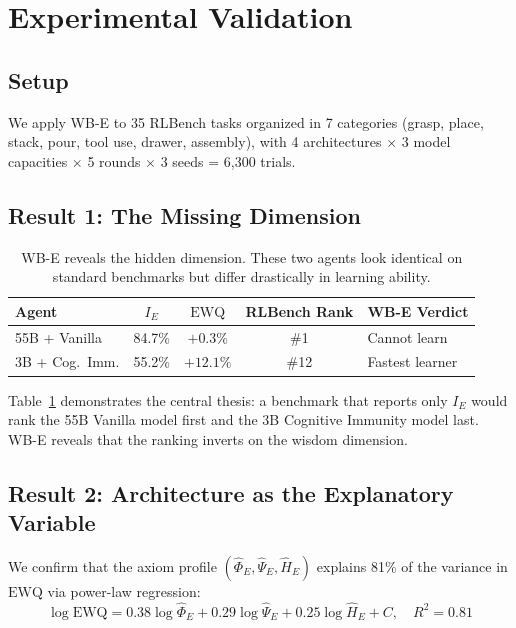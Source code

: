 \documentclass{article}
\newcommand{\EWQ}{\mathrm{EWQ}}
\begin{document}
\section{Experimental Validation}
\label{sec:experiments}

\subsection{Setup}

We apply WB-E to 35 RLBench tasks organized in 7 categories (grasp, place, stack, pour, tool use, drawer, assembly), with 4 architectures $\times$ 3 model capacities $\times$ 5 rounds $\times$ 3 seeds = 6{,}300 trials.

\subsection{Result 1: The Missing Dimension}

\begin{table}[t]
\centering
\caption{WB-E reveals the hidden dimension. These two agents look identical on standard benchmarks but differ drastically in learning ability.}
\label{tab:hidden_dim}
\begin{tabular}{lcccl}
\toprule
\textbf{Agent} & $I_E$ & $\EWQ$ & RLBench Rank & \textbf{WB-E Verdict} \\
\midrule
55B + Vanilla & 84.7\% & $+0.3\%$ & \#1 & {\color{red}Cannot learn} \\
3B + Cog.\ Imm. & 55.2\% & $+12.1\%$ & \#12 & {\color{blue}Fastest learner} \\
\bottomrule
\end{tabular}
\end{table}

Table~\ref{tab:hidden_dim} demonstrates the central thesis: a benchmark that reports only $I_E$ would rank the 55B Vanilla model first and the 3B Cognitive Immunity model last.
WB-E reveals that the ranking inverts on the wisdom dimension.

\subsection{Result 2: Architecture as the Explanatory Variable}

We confirm that the axiom profile $(\hat{\Phi}_E, \hat{\Psi}_E, \hat{H}_E)$ explains 81\% of the variance in $\EWQ$ via power-law regression:
\begin{equation}
    \log \EWQ = 0.38 \log \hat{\Phi}_E + 0.29 \log \hat{\Psi}_E + 0.25 \log \hat{H}_E + C, \quad R^2 = 0.81
\end{equation}
\end{document}
